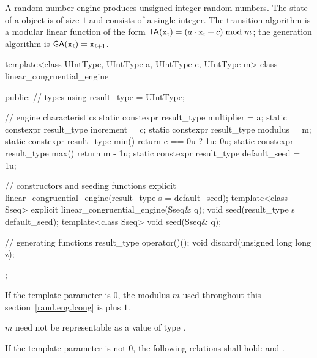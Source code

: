 \pnum
A  random number engine
produces unsigned integer random numbers.
The state%
of a  object 
is of size $1$
and consists of a single integer.
The transition algorithm%
%
is a modular linear function of the form
$\mathsf{TA}(\texttt{\protect x}_{i}) = (a \cdot \texttt{\protect x}_{i} + c) \bmod m$;
the generation algorithm%
%
is $ \mathsf{GA}(\texttt{\protect x}_{i}) = \texttt{\protect x}_{i+1} $.

%
\begin{codeblock}
template<class UIntType, UIntType a, UIntType c, UIntType m>
  class linear_congruential_engine {
  public:
    // types
    using result_type = UIntType;

    // engine characteristics
    static constexpr result_type multiplier = a;
    static constexpr result_type increment = c;
    static constexpr result_type modulus = m;
    static constexpr result_type min() { return c == 0u ? 1u: 0u; }
    static constexpr result_type max() { return m - 1u; }
    static constexpr result_type default_seed = 1u;

    // constructors and seeding functions
    explicit linear_congruential_engine(result_type s = default_seed);
    template<class Sseq> explicit linear_congruential_engine(Sseq& q);
    void seed(result_type s = default_seed);
    template<class Sseq> void seed(Sseq& q);

    // generating functions
    result_type operator()();
    void discard(unsigned long long z);
  };
\end{codeblock}

\pnum
If the template parameter
 is $0$,
the modulus $m$
used throughout this section~\ref{rand.eng.lcong}
is  plus $1$.
\begin{note}
 $m$ need not be representable
 as a value of type .
\end{note}

\pnum
If the template parameter
 is not $0$,
the following relations shall hold:
and
  .

